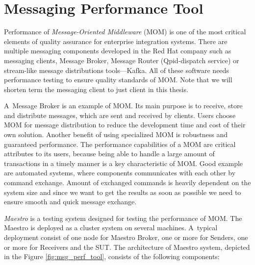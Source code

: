 
\chapter{Messaging Performance Tool}
\label{Messaging Performance Tool}
Performance of \emph{Message-Oriented Middleware} (MOM) \cite{CURRY:MOM} is one of the most critical elements of quality assurance for enterprise integration systems. There are multiple messaging components developed in the Red Hat company such as messaging clients, Message Broker, Message Router (Qpid-dispatch service) or stream-like message distributions tools---Kafka. All of these software needs performance testing to ensure quality standards of MOM. Note that we will shorten term the messaging client to just client in this thesis.

A~Message Broker is an example of MOM. Its main purpose is to receive, store and distribute messages, which are sent and received by clients. Users choose MOM for message distribution to reduce the development time and cost of their own solution. Another benefit of using specialized MOM is robustness and guaranteed performance. The performance capabilities of a MOM are critical attributes to its users, because being able to handle a large amount of transactions in a timely manner is a key characteristic of MOM. Good example are automated systems, where components communicates with each other by command exchange. Amount of exchanged commands is heavily dependent on the system size and since we want to get the results as soon as possible we need to ensure smooth and quick message exchange.

\emph{Maestro} \cite{ORPISKE:MSGPT} is a testing system designed for testing the performance of MOM. The Maestro is deployed as a cluster system on several machines. A~typical deployment consist of one node for Maestro Broker, one or more for Senders, one or more for Receivers and the SUT. The architecture of Maestro system, depicted in the Figure \ref{fig:msg_perf_tool}, consists of the following components:

